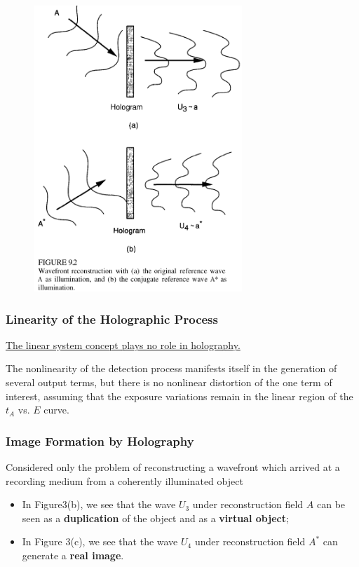\documentclass[en,hazy,device=normal,blue,14pt]{elegantnote}
\begin{document}
\begin{figure}[htbp]
  \centering
  \includegraphics[width=0.7\textwidth]{2.png}
\end{figure}

\subsubsection{Linearity of the Holographic Process}
\uline{The linear system concept plays no role in holography.}

The nonlinearity of the detection process manifests itself in the generation of several output terms, but there is no nonlinear distortion of the one term of interest, assuming that the exposure variations remain in the linear region of the $t_A$ vs. $E$ curve.

\subsubsection{Image Formation by Holography}
Considered only the problem of reconstructing a wavefront which arrived at a recording medium from a coherently illuminated object
\begin{itemize}
  \item In Figure3(b), we see that the wave $U_3$ under reconstruction field $A$ can be seen as a \textbf{duplication} of the object and as a \textbf{virtual object};
  \item In Figure 3(c), we see that the wave $U_4$ under reconstruction field $A^*$ can generate a \textbf{real image}.
\end{itemize}
\end{document}
